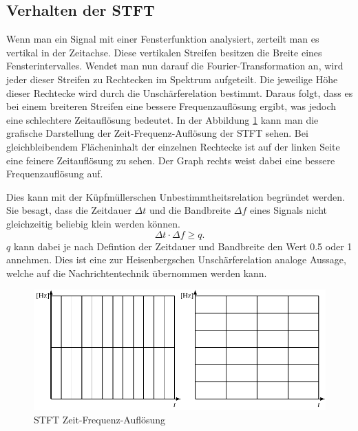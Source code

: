 \subsection{Verhalten der STFT}

Wenn man ein Signal mit einer Fensterfunktion analysiert, zerteilt man es vertikal in der Zeitachse. Diese vertikalen Streifen besitzen die Breite eines Fensterintervalles. Wendet man nun darauf die Fourier-Transformation an, wird jeder dieser Streifen zu Rechtecken im Spektrum aufgeteilt. Die jeweilige Höhe dieser Rechtecke wird durch die Unschärferelation bestimmt. Daraus folgt, dass es bei einem breiteren Streifen eine bessere Frequenzauflösung ergibt, was jedoch eine schlechtere Zeitauflösung bedeutet. In der Abbildung \ref{fig:stftauf} kann man die grafische Darstellung der Zeit-Frequenz-Auflösung der STFT sehen. Bei gleichbleibendem Flächeninhalt der einzelnen Rechtecke ist auf der linken Seite eine feinere Zeitauflösung zu sehen. Der Graph rechts weist dabei eine bessere Frequenzauflösung auf. 

Dies kann mit der Küpfmüllerschen Unbestimmtheitsrelation begründet werden. Sie besagt, dass die Zeitdauer $\Delta t$ und die Bandbreite $\Delta f$ eines Signals nicht gleichzeitig beliebig klein werden können.  
\[\Delta t \cdot \Delta f \geq q.\]
$q$ kann dabei je nach Defintion der Zeitdauer und Bandbreite den Wert 0.5 oder 1 annehmen. Dies ist eine zur Heisenbergschen Unschärferelation analoge Aussage, welche auf die Nachrichtentechnik übernommen werden kann.


\begin{figure}
\centering
\includegraphics[width=0.9\linewidth]{papers/autotune/sections/fft/images/windows.pdf}
\caption{STFT Zeit-Frequenz-Auflösung}\label{fig:stftauf}	
\end{figure}



